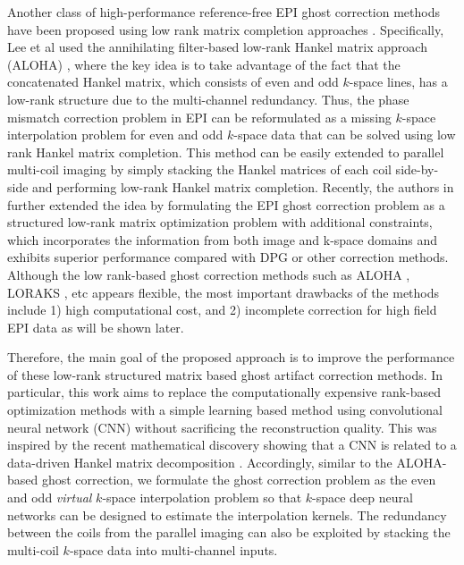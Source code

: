 \documentclass[num-refs]{wiley-article}
\newcommand{\0}{{\boldsymbol{0}}}
\newcommand{\1}{\blmath{1}}
\begin{document}
	Another class of high-performance reference-free EPI ghost correction methods  have been proposed using low rank matrix  completion approaches \cite{Lee2016reference,mani2017multi,lobos2017navigator,lobos2018navigator,lyu2018robust,liu2019pecgrappa}. Specifically, Lee et al \cite{Lee2016reference} used the annihilating filter-based low-rank Hankel matrix approach (ALOHA) \cite{jin2016general,ye2017compressive,lee2016acceleration}, where the key idea is to take advantage of the fact that the concatenated Hankel matrix, which consists of even and odd $k$-space lines, has a low-rank structure due to the multi-channel redundancy. Thus, the phase mismatch correction problem in EPI can be reformulated as a missing $k$-space interpolation problem for even and odd $k$-space data that can be solved using low rank Hankel matrix completion. This method can be easily extended to parallel multi-coil imaging  by simply stacking the Hankel matrices of each coil side-by-side and performing low-rank Hankel matrix completion. Recently, the authors in \cite{lobos2018navigator} further extended the idea by formulating the EPI ghost correction problem as a structured low-rank matrix optimization problem with additional constraints, which incorporates the information from both image and k-space domains and exhibits superior performance compared with DPG or other correction methods. Although the low rank-based ghost correction methods such as ALOHA  \cite{Lee2016reference}, LORAKS  \cite{lobos2018navigator}, etc appears flexible, the most important drawbacks of the methods include 1) high computational cost, and 2) incomplete correction for high field EPI data as will be shown later. 
	
	Therefore, the main goal of the proposed approach is to improve the performance of these low-rank structured matrix based ghost artifact correction methods. In particular, this work aims to replace the computationally expensive rank-based optimization methods  with a simple learning based method using convolutional neural network (CNN) without sacrificing the reconstruction quality. This was inspired by the recent mathematical discovery showing that a CNN is related to a data-driven Hankel matrix decomposition \cite{ye2018deep}. Accordingly, similar to the ALOHA-based ghost correction, we formulate the ghost correction problem as the even and odd {\em virtual} $k$-space interpolation problem so that $k$-space deep neural networks can be designed to estimate the interpolation kernels. The redundancy between the coils from the parallel imaging can also be exploited by stacking the multi-coil $k$-space data into multi-channel inputs. 
	
\end{document}
